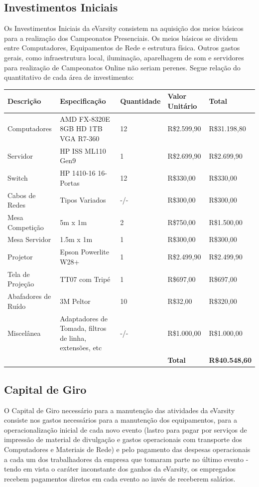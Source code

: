 \documentclass[a4paper, 12pt]{paper}
\begin{document}
\subsection{Investimentos Iniciais}
Os Investimentos Iniciais da eVarsity consistem na aquisição dos meios básicos para a realização dos Campeonatos Presenciais. Os meios básicos se dividem entre Computadores, Equipamentos de Rede e estrutura física. Outros gastos gerais, como infraestrutura local, iluminação, aparelhagem de som e servidores para realização de Campeonatos Online não seriam perenes. Segue relação do quantitativo de cada área de investimento:
\begin{table}[ht]
	\centering
	\begin{tabular}{p{3.5cm}p{4.3cm}p{2cm}p{2cm}p{2.5cm}}
		\hline
		\cellcolor{gray}Descrição&\cellcolor{gray}Especificação&\cellcolor{gray}Quantidade&\cellcolor{gray}Valor Unitário&\cellcolor{gray}Total \\
		\hline
		Computadores&AMD FX-8320E 8GB HD 1TB VGA R7-360&12&R\$2.599,90&R\$31.198,80\\
		Servidor&HP ISS ML110 Gen9&1&R\$2.699,90&R\$2.699,90\\
		Switch&HP 1410-16 16-Portas&12&R\$330,00&R\$330,00\\
		Cabos de Redes&Tipos Variados&-/-&R\$300,00&R\$300,00\\
		Mesa Competição&5m x 1m&2&R\$750,00&R\$1.500,00\\
		Mesa Servidor&1.5m x 1m&1&R\$300,00&R\$300,00\\
		Projetor&Epson Powerlite W28+&1&R\$2.499,90&R\$2.499,90\\
		Tela de Projeção&TT07 com Tripé&1&R\$697,00&R\$697,00\\
		Abafadores de Ruído&3M Peltor&10&R\$32,00&R\$320,00\\
		Miscelânea&Adaptadores de Tomada, filtros de linha, extensões, etc&-/-&R\$1.000,00&R\$1.000,00\\
		\hline
		&&&\textbf{Total}&\textbf{R\$40.548,60}\\
		\hline
	\end{tabular}
\end{table}
\subsection{Capital de Giro}
O Capital de Giro necessário para a manutenção das atividades da eVarsity consiste nos gastos necessários para a manutenção dos equipamentos, para a operacionalização inicial de cada novo evento (lastro para pagar por serviços de impressão de material de divulgação e gastos operacionais com transporte dos Computadores e Materiais de Rede) e pelo pagamento das despesas operacionais a cada um dos trabalhadores da empresa que tomaram parte no último evento - tendo em vista o caráter inconstante dos ganhos da eVarsity, os empregados recebem pagamentos diretos em cada evento ao invés de receberem salários.
\end{document}
